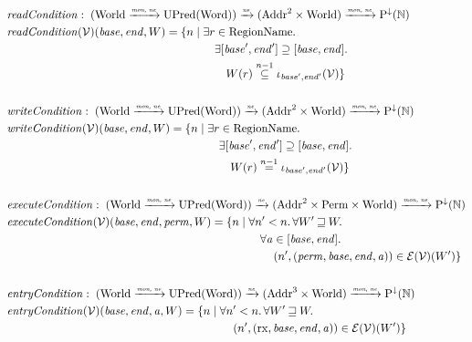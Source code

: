 \documentclass[a4paper]{article}
\newcommand{\monnefun}{\xrightarrow{\textit{\tiny{mon, ne}}}}
\newcommand{\nefun}{\xrightarrow{\textit{\tiny{ne}}}}
\newcommand{\nequal}[1][n]{\stackrel{\tiny{#1}}{=}}
\newcommand{\nsubeq}[1][n]{\stackrel{\tiny{#1}}{\subseteq}}
\newcommand{\var}[1]{\mathit{#1}}
\newcommand{\addr}{\var{a}}
\newcommand{\start}{\var{base}}
\newcommand{\addrend}{\var{end}}
\newcommand{\perm}{\var{perm}}
\newcommand{\plainfun}[2]{
  \ifthenelse{\equal{#2}{}}
             {\mathit{#1}}
             {\mathit{#1}(#2)}
}
\newcommand{\readCond}[1]{\plainfun{readCondition}{#1}}
\newcommand{\writeCond}[1]{\plainfun{writeCondition}{#1}}
\newcommand{\execCond}[1]{\plainfun{executeCondition}{#1}}
\newcommand{\entryCond}[1]{\plainfun{entryCondition}{#1}}
\newcommand{\future}{\mathbin{\sqsupseteq}}
\newcommand{\asmType}{\plaindom{AsmType}}
\newcommand{\plaindom}[1]{\mathrm{#1}}
\newcommand{\Words}{\plaindom{Word}}
\newcommand{\Addrs}{\plaindom{Addr}}
\newcommand{\nats}{\mathbb{N}}
\newcommand{\Perms}{\plaindom{Perm}}
\newcommand{\RegionNames}{\plaindom{RegionName}}
\newcommand{\Worlds}{\plaindom{World}}
\newcommand{\UPred}[1]{\plaindom{UPred}(#1)}
\newcommand{\DCPred}[1]{\plaindom{P}^\downarrow(#1)}
\newcommand{\intr}[2]{\mathcal{#1}}
\newcommand{\valueintr}[1]{\intr{V}{#1}}
\newcommand{\exprintr}[1]{\intr{E}{#1}}
\newcommand{\stdvr}{\valueintr{\asmType}}
\newcommand{\stder}{\exprintr{\asmType}}
\newcommand{\npair}[2][n]{\left(#1,#2 \right)}
\newcommand{\plainperm}[1]{\mathrm{#1}}
\newcommand{\exec}{\plainperm{rx}}
\begin{document}
\begin{align*}
  & \readCond{} : \; (\Worlds \monnefun \UPred{\Words}) \nefun (\Addrs^2 \times \Worlds) \monnefun \DCPred{\nats} \\
  & \readCond{}(\stdvr)(\start,\addrend,W) =        
  \begin{aligned}[t]
    \{ n \mid & \;\exists r \in \RegionNames \ldotp \\
              & \;\quad \exists [\start',\addrend'] \supseteq [\start,\addrend] \ldotp \\
              & \;\qquad W(r)\nsubeq[n-1] \iota_{\start',\addrend'}(\stdvr) \}
  \end{aligned}\\
 & \\
  & \writeCond{} : \; (\Worlds \monnefun \UPred{\Words}) \nefun (\Addrs^2 \times \Worlds) \monnefun \DCPred{\nats} \\
  & \writeCond{}(\stdvr)(\start,\addrend, W) = 
  \begin{aligned}[t]
    \{ n \mid & \; \exists r \in \RegionNames \ldotp \\
              & \;\quad \exists [\start',\addrend'] \supseteq [\start,\addrend] \ldotp \\
              & \; \qquad W(r) \nequal[n-1] \iota_{\start',\addrend'}(\stdvr)  \}
  \end{aligned}\\
 & \\
  & \execCond{} : \; (\Worlds \monnefun \UPred{\Words}) \nefun (\Addrs^2 \times \Perms \times \Worlds) \monnefun \DCPred{\nats} \\
  & \execCond{}(\stdvr)(\start,\addrend,\perm,W) = 
  \begin{aligned}[t]
    \{ n \mid & \; \forall n' < n \ldotp \forall W' \future W \ldotp \\
              & \; \quad \forall \addr \in [\start,\addrend] \ldotp \\
              & \; \qquad \npair[n']{(\perm,\start,\addrend,\addr)} \in \stder(\stdvr)(W') \}
  \end{aligned} \\
 & \\
  & \entryCond{} : \;  (\Worlds \monnefun \UPred{\Words}) \nefun (\Addrs^3 \times \Worlds) \monnefun \DCPred{\nats} \\
  & \entryCond{}(\stdvr)(\start,\addrend,\addr,W) =
  \begin{aligned}[t]
    \{ n \mid & \; \forall n' < n \ldotp \forall W' \future W \ldotp \\
              & \; \quad \npair[n']{(\exec,\start,\addrend,\addr)} \in \stder(\stdvr)(W') \}
  \end{aligned}
\end{align*}
\end{document}
